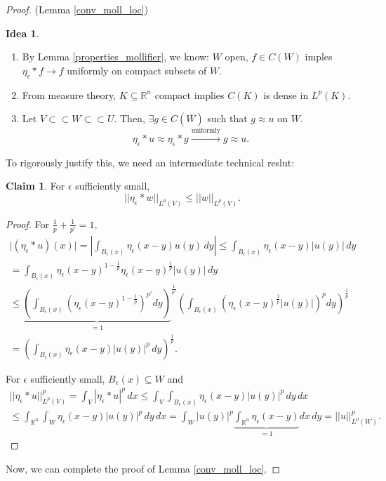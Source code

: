 \documentclass[12pt]{article}
\theoremstyle{definition}
\newtheorem*{claim*}{Claim}
\newtheorem*{idea}{Idea}
\begin{document}
\begin{proof}
(Lemma \ref{conv_moll_loc})
\begin{idea}
\begin{enumerate}[label=\arabic*.]
\item By Lemma \ref{properties_mollifier}, we know: $W$ open, $f\in C(W)$ imples $\eta_\epsilon*f\rightarrow f$ uniformly on compact subsets of $W$.

\item From measure theory, $K\subseteq\mathbb R^n$ compact implies $C(K)$ is dense in $L^p(K)$.

\item Let $V\subset\subset W\subset\subset U$. Then, $\exists g\in C(\overline W)$ such that $g\approx u$ on $W$.
\[\eta_\epsilon*u\approx\eta_\epsilon*g\xrightarrow{\text{uniformly}}g\approx u.\]
\end{enumerate}
\end{idea}

To rigorously justify this, we need an intermediate technical reslut:
\begin{claim*}
For $\epsilon$ sufficiently small,
\[||\eta_\epsilon*w||_{L^p(V)}\leq||w||_{L^p(V)}.\]
\end{claim*}

\begin{proof}
For $\frac1p+\frac1{p'}=1$,
\begin{multline*}
\big|(\eta_\epsilon*u)(x)\big|=\left|\int_{B_\epsilon(x)}\eta_\epsilon(x-y)u(y)\,dy\right|\leq\int_{B_\epsilon(x)}\eta_\epsilon(x-y)|u(y)|\,dy\\
=\int_{B_\epsilon(x)}\eta_\epsilon(x-y)^{1-\frac1p}\eta_\epsilon(x-y)^{\frac1p}|u(y)|\,dy\\
\leq{\underbrace{\left(\int_{B_\epsilon(x)}\left(\eta_\epsilon(x-y)^{1-\frac1p}\right)^{p'}dy\right)}_{=1}}^{\frac1{p'}}\left(\int_{B_\epsilon(x)}\left(\eta_\epsilon(x-y)^{\frac1p}|u(y)|\right)^pdy\right)^{\frac1p}\\
=\left(\int_{B_\epsilon(x)}\eta_\epsilon(x-y)|u(y)|^p\,dy\right)^{\frac1p}.
\end{multline*}

For $\epsilon$ sufficiently small, $B_\epsilon(x)\subseteq W$ and
\begin{multline*}
||\eta_\epsilon*u||_{L^p(V)}^p=\int_V|\eta_\epsilon*u|^p\,dx\leq\int_V\int_{B_\epsilon(x)}\eta_\epsilon(x-y)|u(y)|^p\,dy\,dx\\
\leq\int_{\mathbb R^n}\int_W\eta_\epsilon(x-y)|u(y)|^p\,dy\,dx=\int_W|u(y)|^p\underbrace{\int_{\mathbb R^n}\eta_\epsilon(x-y)}_{=1}dx\,dy=||u||_{L^p(W)}^p.
\end{multline*}
\end{proof}
Now, we can complete the proof of Lemma \ref{conv_moll_loc}.


\end{proof}
\end{document}
